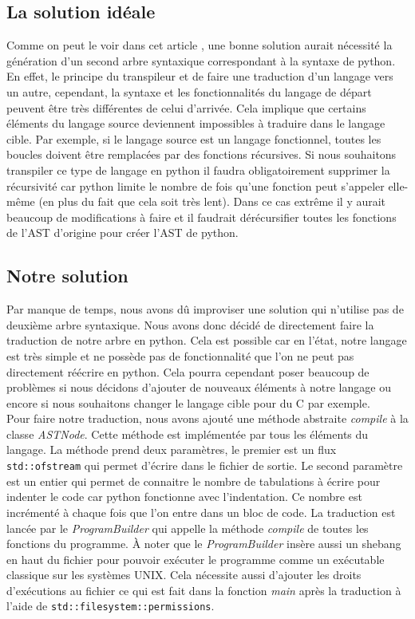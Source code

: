 \documentclass[a4paper]{article}%
\begin{document}
\subsection{La solution idéale}

Comme on peut le voir dans cet article \cite{tutotranspiler}, une bonne solution
aurait nécessité la génération d'un second arbre syntaxique correspondant à la
syntaxe de python. En effet, le principe du transpileur et de faire une
traduction d'un langage vers un autre, cependant, la syntaxe et les
fonctionnalités du langage de départ peuvent être très différentes de celui
d'arrivée. Cela implique que certains éléments du langage source deviennent
impossibles à traduire dans le langage cible. Par exemple, si le langage source
est un langage fonctionnel, toutes les boucles doivent être remplacées par des
fonctions récursives. Si nous souhaitons transpiler ce type de langage en python
il faudra obligatoirement supprimer la récursivité car python limite le
nombre de fois qu'une fonction peut s'appeler elle-même (en plus du fait que
cela soit très lent). Dans ce cas extrême il y aurait beaucoup de modifications
à faire et il faudrait dérécursifier toutes les fonctions de l'AST d'origine
pour créer l'AST de python.

\subsection{Notre solution}

Par manque de temps, nous avons dû improviser une solution qui n'utilise pas de
deuxième arbre syntaxique. Nous avons donc décidé de directement faire la
traduction de notre arbre en python. Cela est possible car en l'état, notre
langage est très simple et ne possède pas de fonctionnalité que l'on ne peut pas
directement réécrire en python. Cela pourra cependant poser beaucoup de
problèmes si nous décidons d'ajouter de nouveaux éléments à notre langage ou
encore si nous souhaitons changer le langage cible pour du C par exemple.\\

Pour faire notre traduction, nous avons ajouté une méthode abstraite
\textit{compile} à la classe \textit{ASTNode}. Cette méthode est implémentée par
tous les éléments du langage. La méthode prend deux paramètres, le premier est un
flux \lstinline{std::ofstream} qui permet d'écrire dans le fichier de sortie. Le
second paramètre est un entier qui permet de connaitre le nombre de tabulations
à écrire pour indenter le code car python fonctionne avec l'indentation. Ce
nombre est incrémenté à chaque fois que l'on entre dans un bloc de code. La
traduction est lancée par le \textit{ProgramBuilder} qui appelle la méthode
\textit{compile} de toutes les fonctions du programme. À noter que le
\textit{ProgramBuilder} insère aussi un \gls{shebang} en haut du fichier pour
pouvoir exécuter le programme comme un exécutable classique sur les systèmes
UNIX. Cela nécessite aussi d'ajouter les droits d'exécutions au fichier ce qui
est fait dans la fonction \textit{main} après la traduction à l'aide de
\lstinline{std::filesystem::permissions}.
\end{document}
